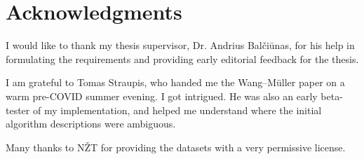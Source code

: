 \documentclass[a4paper]{article}
\newcommand{\WM}{Wang--M{\"u}ller}
\begin{document}
\section{Acknowledgments}
\label{sec:acknowledgments}

I would like to thank my thesis supervisor, Dr. Andrius Balčiūnas, for his help
in formulating the requirements and providing early editorial feedback for the
thesis.

I am grateful to Tomas Straupis, who handed me the {\WM}\cite{wang1998line}
paper on a warm pre-COVID summer evening. I got intrigued. He was also an early
beta-tester of my implementation, and helped me understand where the initial
algorithm descriptions were ambiguous.

Many thanks to NŽT\cite{nzt} for providing the datasets with a very permissive
license.

\printbibliography
\end{document}
